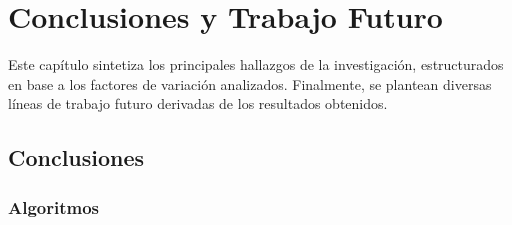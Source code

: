 \chapter{Conclusiones y Trabajo Futuro}
\label{ch:conclusiones}

Este capítulo sintetiza los principales hallazgos de la investigación, estructurados en base a los factores de variación analizados. Finalmente, se plantean diversas líneas de trabajo futuro derivadas de los resultados obtenidos.

\section{Conclusiones}

\subsection{Algoritmos}


